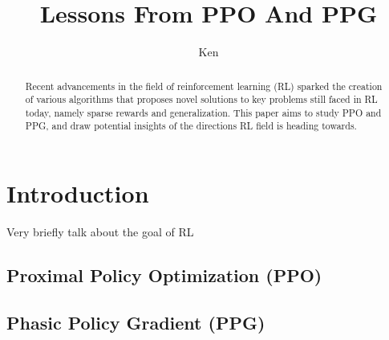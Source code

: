 \documentclass[12pt]{article} %
\title{Lessons From PPO And PPG}
\author{Ken}
\begin{document}
\maketitle
\begin{abstract}
Recent advancements in the field of reinforcement learning (RL) sparked the creation of various algorithms that proposes novel solutions to key problems still faced in RL today, namely sparse rewards and generalization. This paper aims to study PPO and PPG, and draw potential insights of the directions RL field is heading towards. 
\end{abstract}

\section{Introduction}
Very briefly talk about the goal of RL 
\subsection{Proximal Policy Optimization (PPO)}
\subsection{Phasic Policy Gradient (PPG)}
\end{document}
